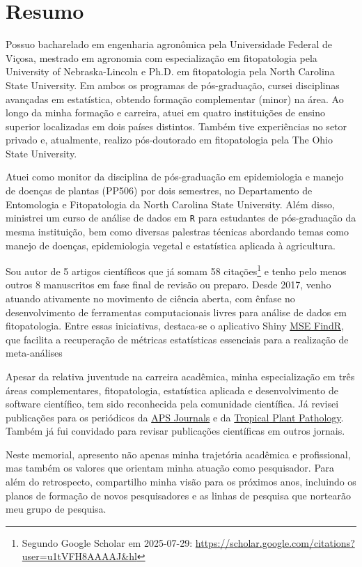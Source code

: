 \documentclass[12pt,a4paper,oneside]{book}
\newcommand{\UFV}{Universidade Federal de Viçosa}
\newcommand{\UNL}{University of Nebraska-Lincoln}
\newcommand{\NCState}{North Carolina State University}
\newcommand{\OSU}{The Ohio State University}
\newcommand{\APSJournals}{\href{https://apsjournals.apsnet.org/}{APS Journals}}
\newcommand{\TropicalPP}{\href{https://link.springer.com/journal/40858}{Tropical Plant Pathology}}
\newcommand{\MSEFindR}{\href{https://garnica.shinyapps.io/MSE_FindR/}{MSE FindR}}
\begin{document}
\chapter*{Resumo}

Possuo bacharelado em engenharia agronômica pela \UFV{}, mestrado em agronomia com especialização em 
fitopatologia pela \UNL{} e Ph.D. em fitopatologia pela \NCState{}. Em ambos os programas de pós-graduação, 
cursei disciplinas avançadas em estatística, obtendo formação complementar (minor) na área. Ao longo da
minha formação e carreira, atuei em quatro instituições de ensino superior localizadas em dois países 
distintos. Também tive experiências no setor privado e, atualmente, realizo pós-doutorado em fitopatologia 
pela \OSU{}.

Atuei como monitor da disciplina de pós-graduação em epidemiologia e manejo de doenças de plantas (PP506) por 
dois semestres, no Departamento de Entomologia e Fitopatologia da \NCState{}. Além disso, ministrei 
um curso de análise de dados em \texttt{R} para estudantes de pós-graduação da mesma instituição, bem 
como diversas palestras técnicas abordando temas como manejo de doenças, epidemiologia vegetal e 
estatística aplicada à agricultura.

Sou autor de 5 artigos científicos que já somam 58 citações\footnote{Segundo Google Scholar em 2025-07-29: \url{https://scholar.google.com/citations?user=u1tVFH8AAAAJ&hl}} e
tenho pelo menos outros 8 manuscritos em fase final de revisão ou preparo. Desde 2017, venho 
atuando ativamente no movimento de ciência aberta, com ênfase no desenvolvimento de ferramentas 
computacionais livres para análise de dados em fitopatologia. Entre essas iniciativas, 
destaca-se o aplicativo Shiny \MSEFindR{}, que facilita a recuperação de métricas estatísticas 
essenciais para a realização de meta-análises

Apesar da relativa juventude na carreira acadêmica, minha especialização em três áreas complementares, 
fitopatologia, estatística aplicada e desenvolvimento de software científico, tem sido reconhecida pela 
comunidade científica. Já revisei publicações para os periódicos da \APSJournals{} e da \TropicalPP{}. Também
já fui convidado para revisar publicações científicas em outros jornais.

Neste memorial, apresento não apenas minha trajetória acadêmica e profissional, mas também os valores que 
orientam minha atuação como pesquisador. Para além do retrospecto, compartilho minha visão para os próximos
anos, incluindo os planos de formação de novos pesquisadores e as linhas de pesquisa que nortearão meu grupo de pesquisa.
\end{document}
